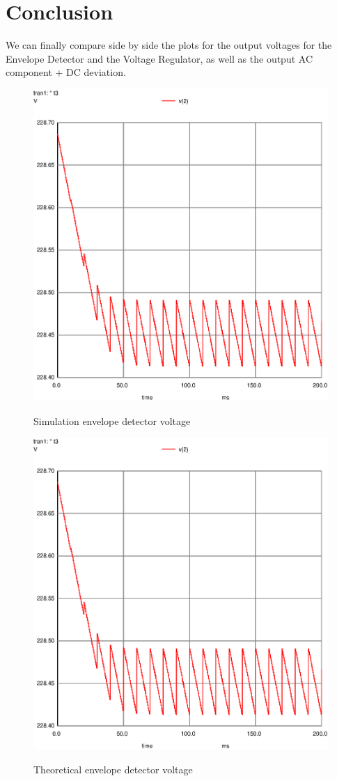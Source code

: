 \newpage
\section{Conclusion}
\label{sec:conclusion}

We can finally compare side by side the plots for the output voltages for the Envelope Detector and the Voltage Regulator, as well as the output AC component + DC deviation. 


\begin{figure}[!ht] \centering
\caption{Simulation envelope detector voltage}
\includegraphics[width=0.6\linewidth]{venv.ps}
\label{fig:sim1}
\end{figure}

\begin{figure}[!ht] \centering
\caption{Theoretical envelope detector voltage}
\includegraphics[width=0.6\linewidth]{venv.ps}
\label{fig:theo1}
\end{figure}
\newpage


